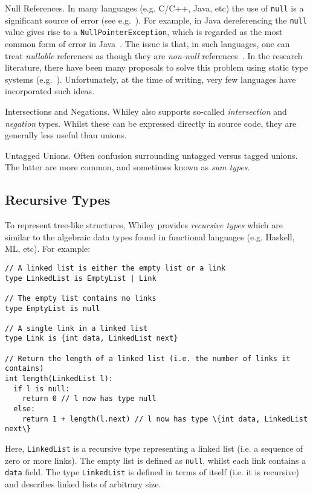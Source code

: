 \begin{insight}{Null References.}  In many languages (e.g. C/C++,
  Java, etc) the use of \lstinline{null} is a significant source of
  error (see e.g.~\cite{Hoa09}).  For example, in Java dereferencing
  the \lstinline{null} value gives rise to a
  \lstinline{NullPointerException}, which is regarded as the most
  common form of error in Java~\cite{XYZ}.  The issue is that, in such
  languages, one can treat {\em nullable} references as though they
  are {\em non-null} references~\cite{Pier02}.  In the research
  literature, there have been many proposals to solve this problem
  using static type systems
  (e.g.~\cite{PQVHV01,FL03,KH07,CFJJ06,CJ07,MPPD08,Hub08,HJP08}).
  Unfortunately, at the time of writing, very few languages have
  incorporated such ideas.
\end{insight}

\begin{insight}{Intersections and Negations.}
  Whiley also supports so-called {\em intersection} and {\em negation}
  types.  Whilst these can be expressed directly in source code, they
  are generally less useful than unions.
\end{insight}

\begin{insight}{Untagged Unions}.  Often confusion surrounding untagged
    versus tagged unions.  The latter are more common, and sometimes
    known as {\em sum types}.
\end{insight}

\subsection{Recursive Types}
To represent tree-like structures, Whiley provides {\em recursive
  types} which are similar to the algebraic data types found in
functional languages (e.g. Haskell, ML, etc).  For example:
\begin{lstlisting}
// A linked list is either the empty list or a link
type LinkedList is EmptyList | Link

// The empty list contains no links
type EmptyList is null

// A single link in a linked list
type Link is {int data, LinkedList next}

// Return the length of a linked list (i.e. the number of links it contains)
int length(LinkedList l):
  if l is null:    
    return 0 // l now has type null
  else:    
    return 1 + length(l.next) // l now has type \{int data, LinkedList next\}
\end{lstlisting}
Here, \lstinline{LinkedList} is a recursive type representing a linked
list (i.e. a sequence of zero or more links).  The empty list is
defined as \lstinline{null}, whilst each link contains a
\lstinline{data} field.  The type \lstinline{LinkedList} is defined in
terms of itself (i.e. it is recursive) and describes linked lists of
arbitrary size.

